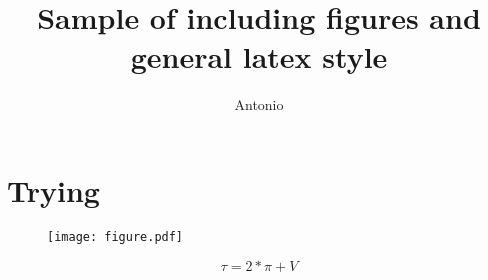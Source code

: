 \documentclass[a4paper,10pt]{article}
\title{Sample of including figures and general latex style}
\author{Antonio}
\begin{document}
\maketitle


\section{Trying}

\blindtext[5]

\begin{figure}
\begin{center}
\texttt{[image: figure.pdf]}
\caption{\blindtext[2]}
\end{center}
\end{figure}

\begin{equation}
\tau = 2 * \pi + V
\end{equation}

\blindtext[3]
\end{document}
